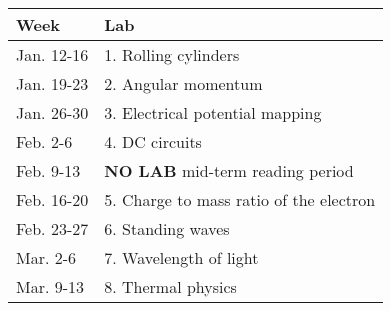 \documentclass[12pt]{article}
\begin{document}
\renewcommand{\arraystretch}{1.2}
\begin{tabular}{|l|l|}
\hline
{\bf Week} & {\bf Lab} \\[1ex] \hline
Jan. 12-16 & 1. Rolling cylinders \\
Jan. 19-23 & 2. Angular momentum \\
Jan. 26-30 & 3. Electrical potential mapping \\
Feb. 2-6 & 4. DC circuits \\
Feb. 9-13 & {\bf NO LAB} mid-term reading period \\
Feb. 16-20 & 5. Charge to mass ratio of the electron \\
Feb. 23-27 & 6. Standing waves \\
Mar. 2-6 & 7. Wavelength of light \\
Mar. 9-13 & 8. Thermal physics \\ \hline
\end{tabular}
\end{document}
